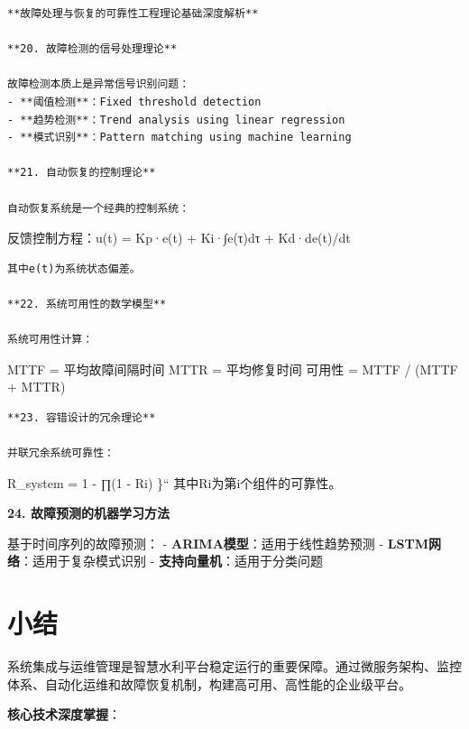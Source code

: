 \begin{lstlisting}
**故障处理与恢复的可靠性工程理论基础深度解析**

**20. 故障检测的信号处理理论**

故障检测本质上是异常信号识别问题：
- **阈值检测**：Fixed threshold detection
- **趋势检测**：Trend analysis using linear regression
- **模式识别**：Pattern matching using machine learning

**21. 自动恢复的控制理论**

自动恢复系统是一个经典的控制系统：
\end{lstlisting}

反馈控制方程：u(t) = Kp·e(t) + Ki·∫e(τ)dτ + Kd·de(t)/dt

\begin{lstlisting}
其中e(t)为系统状态偏差。

**22. 系统可用性的数学模型**

系统可用性计算：
\end{lstlisting}

MTTF = 平均故障间隔时间 MTTR = 平均修复时间 可用性 = MTTF / (MTTF + MTTR)

\begin{lstlisting}
**23. 容错设计的冗余理论**

并联冗余系统可靠性：
\end{lstlisting}

R\_system = 1 - ∏(1 - Ri) \}`` 其中Ri为第i个组件的可靠性。

\textbf{24. 故障预测的机器学习方法}

基于时间序列的故障预测： - \textbf{ARIMA模型}：适用于线性趋势预测 - \textbf{LSTM网络}：适用于复杂模式识别 - \textbf{支持向量机}：适用于分类问题

\section{小结}

系统集成与运维管理是智慧水利平台稳定运行的重要保障。通过微服务架构、监控体系、自动化运维和故障恢复机制，构建高可用、高性能的企业级平台。

\textbf{核心技术深度掌握}：

